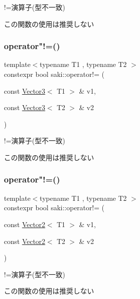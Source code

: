 !=演算子(型不一致) 

この関数の使用は推奨しない \mbox{\label{namespacesaki_a26df5bd85b044f8556c4e258479b54f7}} 
\subsubsection{\texorpdfstring{operator"!=()}{operator!=()}\hspace{0.1cm}{\footnotesize\ttfamily [7/10]}}
{\footnotesize\ttfamily template$<$typename T1 , typename T2 $>$ \\
constexpr bool saki\+::operator!= (\begin{DoxyParamCaption}\item[{const \mbox{\hyperlink{classsaki_1_1_vector3}{Vector3}}$<$ T1 $>$ \&}]{v1,  }\item[{const \mbox{\hyperlink{classsaki_1_1_vector3}{Vector3}}$<$ T2 $>$ \&}]{v2 }\end{DoxyParamCaption})}



!=演算子(型不一致) 

この関数の使用は推奨しない \mbox{\label{namespacesaki_a778d46d9fe6118407c686cc3c3c61ac7}} 
\subsubsection{\texorpdfstring{operator"!=()}{operator!=()}\hspace{0.1cm}{\footnotesize\ttfamily [8/10]}}
{\footnotesize\ttfamily template$<$typename T1 , typename T2 $>$ \\
constexpr bool saki\+::operator!= (\begin{DoxyParamCaption}\item[{const \mbox{\hyperlink{classsaki_1_1_vector2}{Vector2}}$<$ T1 $>$ \&}]{v1,  }\item[{const \mbox{\hyperlink{classsaki_1_1_vector2}{Vector2}}$<$ T2 $>$ \&}]{v2 }\end{DoxyParamCaption})}



!=演算子(型不一致) 

この関数の使用は推奨しない \mbox{\label{namespacesaki_a79218f0b5ef57832094c0fb4b74fb8b2}} 
